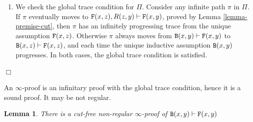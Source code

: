 \documentclass[a4paper,12pt]{article}
\newtheorem{lemma}[theorem]{Lemma}
\newenvironment{proof}[1][Proof]{\begin{trivlist}
\item[\hskip \labelsep {\bfseries #1}]}{\end{trivlist}}
\newcommand{\Backward}         { {\tt B} }
\newcommand{\Forward}         { {\tt F} }
\begin{document}
\begin{proof}
\begin{enumerate}
\item
We check the global trace condition for $\Pi$. Consider any infinite path $\pi$ in $\Pi$. If $\pi$ eventually moves to $\Forward(x,z), R(z,y) \vdash \Forward(x,y)$, proved by Lemma \ref{lemma-premise-cut}, then $\pi$ has an infinitely progressing trace from the unique assumption $\Forward(x,z)$. Otherwise $\pi$ always moves from $\Backward(x,y) \vdash \Forward(x,y)$ to $\Backward(x,z) \vdash \Forward(x,z)$, and each time the unique inductive assumption $\Backward(x,y)$ progresses. In both cases, the global trace condition is satisfied.
\end{enumerate}
$\Box$ \end{proof}


An $\infty$-proof is an infinitary proof with the global trace condition, hence it is a sound proof. It may be not regular. 

\begin{lemma} 
\label{lemma-cut-free-non-regular-proof}
There is a cut-free non-regular $\infty$-proof of $\Backward(x,y) \vdash \Forward(x,y)$
\end{lemma}
\end{document}
